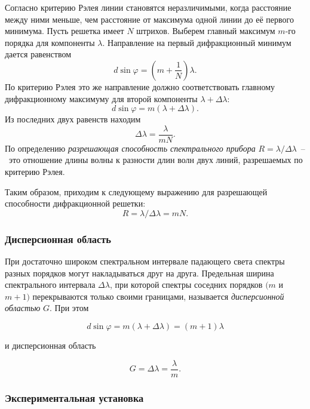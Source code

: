 \documentclass[a4paper,12pt]{article}
\begin{document}
\noindent Согласно критерию Рэлея линии становятся неразличимыми, когда расстояние между ними меньше, чем расстояние от максимума одной линии до её первого минимума. Пусть решетка имеет $N$ штрихов. Выберем главный максимум $m$-го порядка для компоненты $\lambda$. Направление на первый дифракционный минимум дается равенством 
\[ d \sin \varphi = \left( m + \dfrac{1}{N} \right) \lambda. \]
По критерию Рэлея это же направление должно соответствовать главному дифракционному максимуму для второй компоненты $\lambda + \Delta \lambda$:
\[ d \sin \varphi = m (\lambda + \Delta \lambda) .\]
Из последних двух равенств находим 
\begin{equation}
	\Delta \lambda = \dfrac{\lambda}{mN}.
	\label{eq:dif6}
\end{equation}
По определению \textit{разрешающая способность спектрального прибора} $R = \lambda / \Delta \lambda$~--~это отношение длины волны к разности длин волн двух линий, разрешаемых по критерию Рэлея.

\noindent Таким образом, приходим к следующему выражению для разрешающей способности дифракционной решетки:
\begin{equation}
	R = \lambda / \Delta \lambda = mN.
	\label{eq:dif7}
\end{equation}

\subsubsection*{Дисперсионная область}

\noindent При достаточно широком спектральном интервале падающего света спектры разных порядков могут накладываться друг на друга. Предельная ширина спектрального интервала $\Delta \lambda$, при которой спектры соседних порядков $(m$ и $m + 1)$ перекрываются только
своими границами, называется \textit{дисперсионной областью} $G$. При этом

\[d \sin\varphi = m(\lambda + \Delta \lambda ) = (m + 1)\lambda \]

\noindent и дисперсионная область

\begin{equation}
	G = \Delta \lambda = \frac{\lambda}{m}.
	\label{eq:dif8}
\end{equation}

\subsubsection*{Экспериментальная установка}
\end{document}

